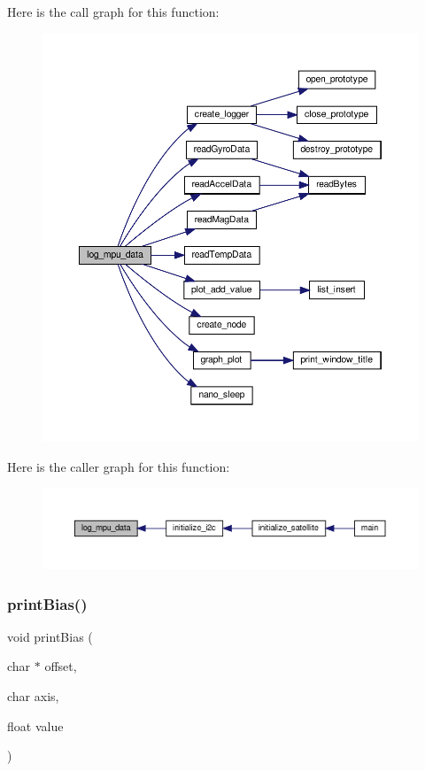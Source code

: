 Here is the call graph for this function\+:\nopagebreak
\begin{figure}[H]
\begin{center}
\leavevmode
\includegraphics[width=350pt]{i2c-interface_8c_a0ffd56a84248b3976097e0d38b2fcdaf_cgraph}
\end{center}
\end{figure}
Here is the caller graph for this function\+:\nopagebreak
\begin{figure}[H]
\begin{center}
\leavevmode
\includegraphics[width=350pt]{i2c-interface_8c_a0ffd56a84248b3976097e0d38b2fcdaf_icgraph}
\end{center}
\end{figure}
\mbox{\label{i2c-interface_8c_a14f7a41ccc0cdae430b5c7086a34e9c0}} 
\subsubsection{\texorpdfstring{print\+Bias()}{printBias()}}
{\footnotesize\ttfamily void print\+Bias (\begin{DoxyParamCaption}\item[{char $\ast$}]{offset,  }\item[{char}]{axis,  }\item[{float}]{value }\end{DoxyParamCaption})}

